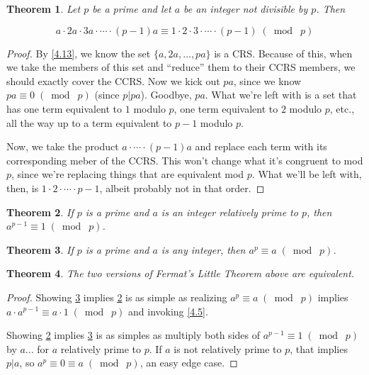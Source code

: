 \documentclass{article}
\newtheorem{thm}{Theorem}[section]
\numberwithin{equation}{thm}
\providecommand{\gmod}[1]{\; (\bmod \; #1)}
\begin{document}
\begin{thm} \label{4.14}
  Let $p$ be a prime and let $a$ be an integer not divisible by $p$. Then

  $$a \cdot 2a \cdot 3a \cdot \cdots \cdot (p-1)a \equiv 1 \cdot 2 \cdot 3 \cdot \cdots \cdot (p-1) \gmod p$$
\end{thm}

\begin{proof}
  By \ref{4.13}, we know the set $\{a, 2a, \ldots, pa\}$ is a CRS. Because of this, when we take the members of this set and ``reduce'' them to their CCRS members, we should exactly cover the CCRS. Now we kick out $pa$, since we know $pa \equiv 0 \gmod p$ (since $p | pa$). Goodbye, $pa$. What we're left with is a set that has one term equivalent to $1$ modulo $p$, one term equivalent to $2$ modulo $p$, etc., all the way up to a term equivalent to $p-1$ modulo $p$.

  Now, we take the product $a \cdot \cdots \cdot (p-1)a$ and replace each term with its corresponding meber of the CCRS. This won't change what it's congruent to mod $p$, since we're replacing things that are equivalent mod $p$. What we'll be left with, then, is $1 \cdot 2 \cdot \cdots \cdot p-1$, albeit probably not in that order.
\end{proof}



\begin{thm} \label{4.15}
  If $p$ is a prime and $a$ is an integer relatively prime to $p$, then $a^{p-1} \equiv 1 \gmod p$.
\end{thm}



\begin{thm} \label{4.16}
  If $p$ is a prime and $a$ is any integer, then $a^p \equiv a \gmod p$.
\end{thm}



\begin{thm} \label{4.17}
  The two versions of Fermat's Little Theorem above are equivalent.
\end{thm}

\begin{proof}
  Showing \ref{4.16} implies \ref{4.15} is as simple as realizing $a^p \equiv a \gmod p$ implies $a \cdot a^{p-1} \equiv a \cdot 1 \gmod p$ and invoking \ref{4.5}.

  Showing \ref{4.15} implies \ref{4.16} is as simples as multiply both sides of $a^{p-1} \equiv 1 \gmod p$ by $a$... for $a$ relatively prime to $p$. If $a$ is not relatively prime to $p$, that implies $p | a$, so $a^p \equiv 0 \equiv a \gmod p$, an easy edge case.
\end{proof}
\end{document}
